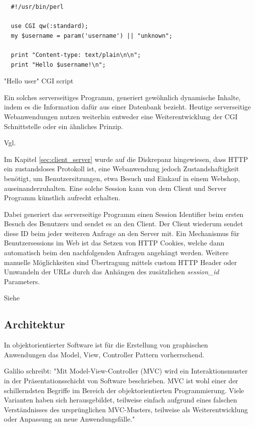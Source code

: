 \begin{listing}[H]
\begin{verbatim}
  #!/usr/bin/perl
  
  use CGI qw(:standard);
  my $username = param('username') || "unknown";
  
  print "Content-type: text/plain\n\n";
  print "Hello $username!\n";
\end{verbatim}
\caption{"Hello user" CGI script}
\label{lst:hello_pl}
\end{listing} 

Ein solches serverseitiges Programm, generiert gewöhnlich dynamische Inhalte, indem es die Information dafür aus einer Datenbank bezieht. Heutige serverseitige Webanwendungen nutzen weiterhin entweder eine Weiterentwicklung der CGI Schnittstelle oder ein ähnliches Prinzip.

Vgl. \cite[Kap. 1.1]{Bekman:2003}

Im Kapitel \ref{sec:client_server} wurde auf die Diskrepanz hingewiesen, dass HTTP ein zustandsloses Protokoll ist, eine Webanwendung jedoch Zustandshaftigkeit benötigt, um Benutzersitzungen, etwa Besuch und Einkauf in einem Webshop, auseinanderzuhalten. Eine solche Session kann von dem Client und Server Programm
künstlich aufrecht erhalten.

Dabei generiert das serverseitige Programm einen Session Identifier beim ersten Besuch des Benutzers und sendet es an den Client. Der Client wiederum sendet diese  ID beim jeder weiteren Anfrage an den Server mit. Ein Mechanismus für Benutzersessions im Web ist das Setzen von HTTP Cookies, welche dann automatisch beim den nachfolgenden Anfragen angehängt werden. Weitere manuelle Möglichkeiten sind  Übertragung mittels custom HTTP Header oder Umwandeln der URLs durch das Anhängen des zusätzlichen \emph{session\_id} Parameters.

Siehe \cite[Stateful Web Applications]{Parikh:2015}  

\subsection{Architektur}

In objektorientierter Software ist für die Erstellung von graphischen Anwendungen das Model, View, Controller Pattern vorherrschend.

Galilio schreibt: "Mit Model-View-Controller (MVC) wird ein Interaktionsmuster in der Präsentationsschicht von Software beschrieben. MVC ist wohl einer der schillerndsten Begriffe im Bereich der objektorientierten Programmierung. Viele Varianten haben sich herausgebildet, teilweise einfach aufgrund eines falschen Verständnisses des ursprünglichen MVC-Musters, teilweise als Weiterentwicklung oder Anpassung an neue Anwendungsfälle."

